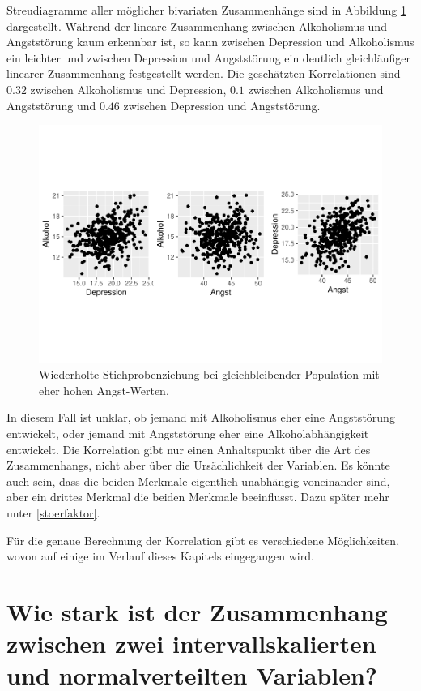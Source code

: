 \documentclass[
]{book}
\theoremstyle{definition}
\theoremstyle{definition}
\theoremstyle{definition}
\theoremstyle{definition}
\theoremstyle{remark}
\begin{document}
Streudiagramme aller möglicher bivariaten Zusammenhänge sind in Abbildung \ref{fig:exm-depression-alkohol-angst-scatter} dargestellt. Während der lineare Zusammenhang zwischen Alkoholismus und Angststörung kaum erkennbar ist, so kann zwischen Depression und Alkoholismus ein leichter und zwischen Depression und Angststörung ein deutlich gleichläufiger linearer Zusammenhang festgestellt werden. Die geschätzten Korrelationen sind \(0.32\) zwischen Alkoholismus und Depression, \(0.1\) zwischen Alkoholismus und Angststörung und \(0.46\) zwischen Depression und Angststörung.

\begin{figure}
\centering
\includegraphics{aps_statistik1_files/figure-latex/exm-depression-alkohol-angst-scatter-1.pdf}
\caption{\label{fig:exm-depression-alkohol-angst-scatter}Wiederholte Stichprobenziehung bei gleichbleibender Population mit eher hohen Angst-Werten.}
\end{figure}

In diesem Fall ist unklar, ob jemand mit Alkoholismus eher eine Angststörung entwickelt, oder jemand mit Angststörung eher eine Alkoholabhängigkeit entwickelt. Die Korrelation gibt nur einen Anhaltspunkt über die Art des Zusammenhangs, nicht aber über die Ursächlichkeit der Variablen. Es könnte auch sein, dass die beiden Merkmale eigentlich unabhängig voneinander sind, aber ein drittes Merkmal die beiden Merkmale beeinflusst. Dazu später mehr unter \ref{stoerfaktor}.

Für die genaue Berechnung der Korrelation gibt es verschiedene Möglichkeiten, wovon auf einige im Verlauf dieses Kapitels eingegangen wird.

\section{Wie stark ist der Zusammenhang zwischen zwei intervallskalierten und normalverteilten Variablen?}\label{wie-stark-ist-der-zusammenhang-zwischen-zwei-intervallskalierten-und-normalverteilten-variablen}
\end{document}
